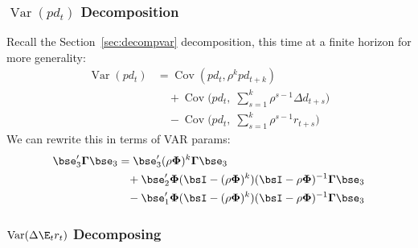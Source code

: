\documentclass[12pt]{article}
\theoremstyle{plain}
\theoremstyle{definition}
\theoremstyle{remark}
\newcommand{\bsGamma}{\boldsymbol{\Gamma}}
\newcommand{\bsPhi}{\boldsymbol{\Phi}}
\newcommand{\Cov}{\operatorname{Cov}}
\newcommand{\Var}{\operatorname{Var}}
\begin{document}
\begin{multicols*}{2}
\columnbreak
\subsubsection{$\Var(pd_t)$ Decomposition}

Recall the Section~\ref{sec:decompvar} decomposition, this
time at a finite horizon for more generality:
\begin{align*}
  \Var(pd_t)
  &=
  \Cov(
      pd_t,
      \rho^k pd_{t+k}
      )
  \\
  &\quad
  +\Cov\bigg(
    pd_t,\;
    \sum_{s=1}^k \rho^{s-1}\Delta d_{t+s}
  \bigg)
  \\
  &\quad-
  \Cov\bigg(
    pd_t,\;
    \sum_{s=1}^k \rho^{s-1}r_{t+s}
  \bigg)
\end{align*}
We can rewrite this in terms of VAR params:
\begin{align*}
  \bse_3'\bsGamma\bse_3
  &=
  \bse_3'
  (\rho\bsPhi)^k\bsGamma
  \bse_3
  \\
  &\;\;\;
  + \bse_2'
  \bsPhi(\bsI-(\rho\bsPhi)^k)(\bsI-\rho\bsPhi)^{-1}
  \bsGamma
  \bse_3
  \\
  &\;\;\;
  - \bse_1'
  \bsPhi(\bsI-(\rho\bsPhi)^k)(\bsI-\rho\bsPhi)^{-1}
  \bsGamma
  \bse_3
\end{align*}

\subsubsection{$\Var(\Delta \E_t r_t)$ Decomposing}


\end{multicols*}
\end{document}
